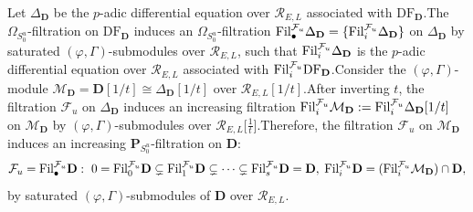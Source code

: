 \documentclass[10pt]{article}
\newcommand{\fil}{{\rm Fil}}
\newcommand{\df}{{\mathrm{DF}}}
\newcommand{\Dpik}{{\mathbf{D}}}
\newcommand{\bP}{{\mathbf{P}}}
\newcommand{\cR}{\mathcal R}
\newcommand{\cM}{\mathcal M}
\newcommand{\cF}{\mathcal F}
\begin{document}
Let ${\Delta_\Dpik}$ be the $p$-adic differential equation over $\cR_{E,L}$ associated with $\df_{\Dpik}$.\;The $\Omega_{S^u_0}$-filtration on $\df_{\Dpik}$ induces an $\Omega_{S^u_0}$-filtration $\fil_{\bullet}^{\cF_u}{\Delta_\Dpik}=\{\fil_{i}^{\cF_u}{\Delta_\Dpik}\}$ on ${\Delta_\Dpik}$ by saturated $(\varphi,\Gamma)$-submodules over $\cR_{E,L}$, such that $\fil_{i}^{\cF_u}{\Delta_\Dpik}$ is the $p$-adic differential equation over $\cR_{E,L}$ associated with $\fil_{i}^{\cF_u} \df_{\Dpik}$.\;Consider the $(\varphi,\Gamma)$-module $\cM_\Dpik=\Dpik[1/t]\cong \Delta_\Dpik [1/t]$ over $\cR_{E,L}[1/t]$.\;After inverting $t$, the filtration $\cF_u$ on $\Delta_\Dpik$ induces an increasing filtration $\fil_{i}^{\cF_u}\cM_\Dpik:=\fil_{i}^{\cF_u}{\Delta_\Dpik}[1/t]$ on $\cM_\Dpik$ by $(\varphi,\Gamma)$-submodules over $\cR_{E,L}\big[\frac{1}{t}\big]$.\;Therefore, the filtration $\cF_u$ on $\cM_\Dpik$ induces an increasing $\bP_{S^u_0}$-filtration on $\Dpik$:
\[\cF_u=\fil_{\bullet}^{\cF_u}\Dpik: \ 0 =\fil_0^{\cF_u}\Dpik \subsetneq \fil_1^{\cF_u}\Dpik \subsetneq \cdots \subsetneq \fil_{s}^{\cF_u} \Dpik=\Dpik,\;\fil_{i}^{\cF_u}\Dpik=(\fil_{i}^{\cF_u}\cM_\Dpik)\cap \Dpik,\]
by saturated $(\varphi,\Gamma)$-submodules of $\Dpik$ over $\cR_{E,L}$.\;
\end{document}

